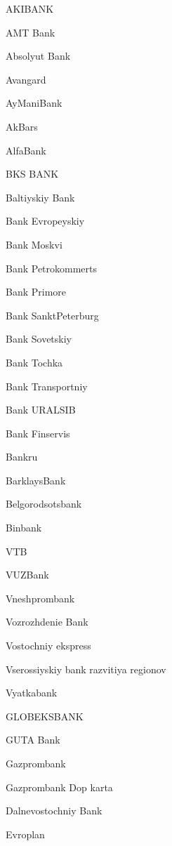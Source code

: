 \documentclass[a4paper,10pt,english]{sphinxmanual}
\begin{document}
\sphinxAtStartPar
AKIBANK

\sphinxAtStartPar
AMT Bank

\sphinxAtStartPar
Absolyut Bank

\sphinxAtStartPar
Avangard

\sphinxAtStartPar
AyManiBank

\sphinxAtStartPar
AkBars

\sphinxAtStartPar
AlfaBank

\sphinxAtStartPar
BKS BANK

\sphinxAtStartPar
Baltiyskiy Bank

\sphinxAtStartPar
Bank Evropeyskiy

\sphinxAtStartPar
Bank Moskvi

\sphinxAtStartPar
Bank Petrokommerts

\sphinxAtStartPar
Bank Primore

\sphinxAtStartPar
Bank SanktPeterburg

\sphinxAtStartPar
Bank Sovetskiy

\sphinxAtStartPar
Bank Tochka

\sphinxAtStartPar
Bank Transportniy

\sphinxAtStartPar
Bank URALSIB

\sphinxAtStartPar
Bank Finservis

\sphinxAtStartPar
Bankru

\sphinxAtStartPar
BarklaysBank

\sphinxAtStartPar
Belgorodsotsbank

\sphinxAtStartPar
Binbank

\sphinxAtStartPar
VTB

\sphinxAtStartPar
VUZBank

\sphinxAtStartPar
Vneshprombank

\sphinxAtStartPar
Vozrozhdenie Bank

\sphinxAtStartPar
Vostochniy ekspress

\sphinxAtStartPar
Vserossiyskiy bank razvitiya regionov

\sphinxAtStartPar
Vyatkabank

\sphinxAtStartPar
GLOBEKSBANK

\sphinxAtStartPar
GUTA Bank

\sphinxAtStartPar
Gazprombank

\sphinxAtStartPar
Gazprombank Dop karta

\sphinxAtStartPar
Dalnevostochniy Bank

\sphinxAtStartPar
Evroplan
\end{document}
